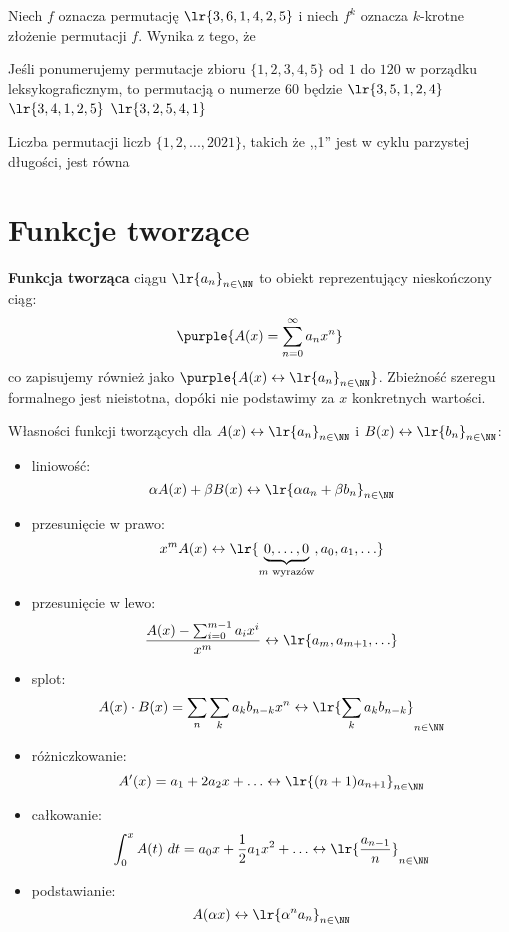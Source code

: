 \begin{problems}
    \prob Niech $f$ oznacza permutację $\lr{3, 6, 1, 4, 2, 5}$ i niech $f^k$ oznacza $k$-krotne złożenie permutacji $f$. Wynika z tego, że

    \prob Jeśli ponumerujemy permutacje zbioru $\{1, 2, 3, 4, 5\}$ od $1$ do $120$ w porządku leksykograficznym, to permutacją o numerze $60$ będzie
    \answers
    {$\lr{3, 5, 1, 2, 4}$}
    {$\lr{3, 4, 1, 2, 5}$}
    {$\lr{3, 2, 5, 4, 1}$}

    \prob Liczba permutacji liczb $\{1, 2, ..., 2021\}$, takich że ,,1'' jest w cyklu parzystej długości, jest równa
\end{problems}

\section{Funkcje tworzące}

\textbf{Funkcja tworząca} ciągu $\lr{a_n}_{n\in\NN}$ to obiekt reprezentujący nieskończony ciąg:
$$\purple{A(x)=\sum_{n=0}^\infty a_nx^n}$$
co zapisujemy również jako $\purple{A(x)\leftrightarrow \lr{a_n}_{n\in\NN}}$. Zbieżność szeregu formalnego jest nieistotna, dopóki nie podstawimy za $x$ konkretnych wartości.

Własności funkcji tworzących dla $A(x)\leftrightarrow \lr{a_n}_{n\in\NN}$ i $B(x)\leftrightarrow \lr{b_n}_{n\in\NN}$:
\begin{itemize}
    \item liniowość: $$\alpha A(x) + \beta B(x) \leftrightarrow \lr{\alpha a_n + \beta b_n}_{n\in\NN}$$
    \item przesunięcie w prawo: $$x^mA(x) \leftrightarrow \lr{\underbrace{0,\ldots,0}_{m\text{ wyrazów}},a_0,a_1,\ldots}$$
    \item przesunięcie w lewo: $$\frac{A(x)-\sum_{i=0}^{m-1}a_ix^i}{x^m} \leftrightarrow \lr{a_m,a_{m+1},\ldots}$$
    \item splot: $$A(x)\cdot B(x)=\sum_n\sum_k a_kb_{n-k}x^n \leftrightarrow 
    \lr{\sum_k a_kb_{n-k}}_{n\in\NN}$$
    \item różniczkowanie: $$A'(x)=a_1+2a_2x+\ldots \leftrightarrow \lr{(n+1)a_{n+1}}_{n\in\NN}$$
    \item całkowanie: $$\int_0^x A(t)\ dt=a_0x+\frac{1}{2}a_1x^2+\ldots \leftrightarrow \lr{\frac{a_{n-1}}{n}}_{n\in\NN}$$
    \item podstawianie: $$A(\alpha x) \leftrightarrow \lr{\alpha^n a_n}_{n\in\NN}$$
\end{itemize}

